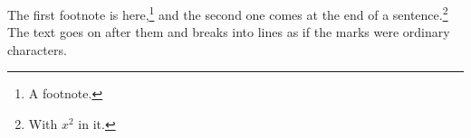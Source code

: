\documentclass{article}
\begin{document}
The first footnote is here,\footnote{A footnote.} and the second one comes
at the end of a sentence.\footnote{With $x^2$ in it.} The text goes on after
them and breaks into lines as if the marks were ordinary characters.
\end{document}
